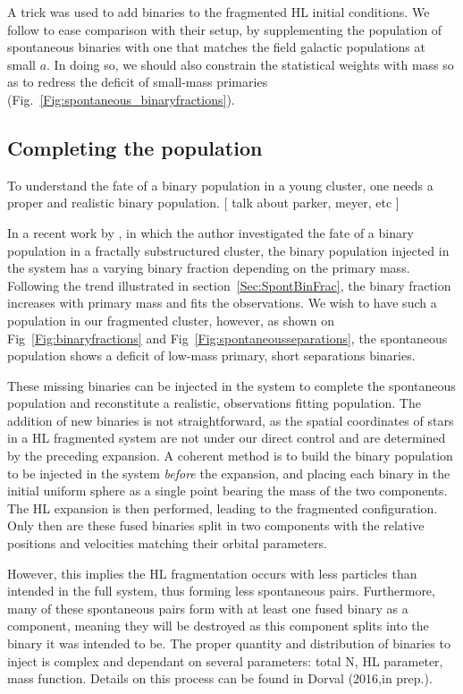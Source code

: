 A trick was used to add  binaries to the fragmented HL initial conditions. We follow \cite{parker2014} to ease comparison with their setup, by supplementing the population of spontaneous binaries with one that matches the field galactic populations at small $a$. 
In doing so, we should also constrain the statistical weights with mass so as to redress the deficit of small-mass primaries (Fig.~\ref{Fig:spontaneous_binaryfractions}).



\subsection{Completing the population}
\label{Sec:Completing}

To understand the fate of a binary population in a young cluster, one needs a proper and realistic binary population. [ talk about parker, meyer, etc ]

In a recent work by \cite{parker2014}, in which the author investigated the fate of a binary population in a fractally substructured cluster, the binary population injected in the system has a varying binary fraction depending on the primary mass. Following the trend illustrated in section~\ref{Sec:SpontBinFrac}, the binary fraction increases with primary mass and fits the observations. We wish to have such a population in our fragmented cluster, however, as shown on Fig~\ref{Fig:binaryfractions} and Fig~\ref{Fig:spontaneousseparations}, the spontaneous population shows a deficit of low-mass primary, short separations binaries.

These missing binaries can be injected in the system to complete the spontaneous population and reconstitute a realistic, observations fitting population. The addition of new binaries is not straightforward, as the spatial coordinates of stars in a HL fragmented system are not under our direct control and are determined by the preceding expansion. A coherent method is to build the binary population to be injected in the system \textit{before} the expansion, and placing each binary in the initial uniform sphere as a single point bearing the mass of the two components. The HL expansion is then performed, leading to the fragmented configuration. Only then are these fused binaries split in two components with the relative positions and velocities matching their orbital parameters.

However, this implies the HL fragmentation occurs with less particles than intended in the full system, thus forming less spontaneous pairs. Furthermore, many of these spontaneous pairs form with at least one fused binary as a component, meaning they will be destroyed as this component splits into the binary it was intended to be. The proper quantity and distribution of binaries to inject is complex and dependant on several parameters: total N, HL parameter, mass function. Details on this process can be found in Dorval (2016,in prep.).


